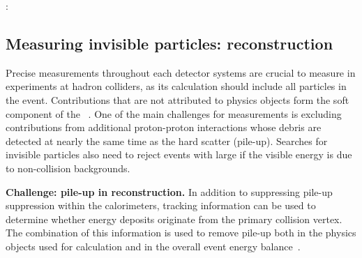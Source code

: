\begin{marginnote}[]
: 
\end{marginnote}



\begin{textbox}[!h]
\section{Measuring invisible particles: \MET reconstruction}

Precise measurements throughout each detector systems are crucial to measure \MET in experiments at hadron colliders, 
as its calculation should include all particles in the event.
Contributions that are not attributed to physics objects form the soft component of the \MET~\cite{Aad:2016nrq,CMS-PAS-JME-16-004}. 
One of the main challenges for \MET measurements is excluding contributions from additional proton-proton interactions whose debris are detected at nearly the same time as the hard scatter (pile-up).
Searches for invisible particles also need to reject events with large \MET if the visible energy is due to non-collision backgrounds. 

\textbf{Challenge: pile-up in \MET reconstruction.} 
In addition to suppressing pile-up suppression within the calorimeters, tracking information can be used to determine whether energy deposits originate from the primary collision vertex. 
The combination of this information is used to remove pile-up both in the physics objects used for \MET calculation and in the overall event energy balance~\cite{CMS-PAS-JME-16-004,ATLAS-CONF-2014-019}. 



\end{textbox}
